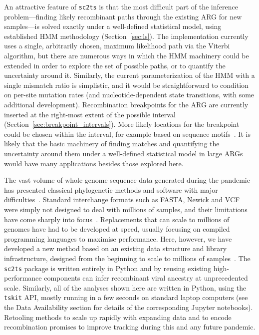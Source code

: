 \documentclass{article}
\begin{document}
An attractive feature of \texttt{sc2ts} is that the most difficult part of
the inference problem---finding likely recombinant paths through the existing ARG
for new samples---is solved exactly under a well-defined statistical model,
using established HMM methodology (Section~\ref{sec:ls}).
The implementation currently uses
a single, arbitrarily chosen, maximum likelihood path via the
Viterbi algorithm, but there are numerous ways in which the HMM machinery
could be extended in order to explore the set of possible paths, or to
quantify the uncertainty around it. Similarly, the current parameterization
of the HMM with a single mismatch ratio is simplistic, and it would
be straightforward to condition on per-site mutation rates (and nucleotide-dependent
state transitions, with some additional development).
Recombination breakpoints for the ARG are currently inserted at the
right-most extent of the possible interval
(Section~\ref{sec:breakpoint_intervals}).
More likely locations for the
breakpoint could be chosen within the interval, for example based
on sequence motifs~\citep{Gallaher2020-mr, Yang2020-ct}.
It is likely that the basic machinery of finding matches and quantifying
the uncertainty around them under a well-defined statistical model
in large ARGs would have many applications besides those explored here.

The vast volume of whole genome sequence data generated during the pandemic
has presented classical phylogenetic methods and software with major
difficulties~\citep{Hodcroft2021-wt}.
Standard interchange formats such as FASTA, Newick and VCF were simply not designed
to deal with millions of samples, and their limitations have come sharply
into focus~\citep{Turakhia2021-ur,de2023maximum}.
Replacements that can scale to millions of genomes have had to be developed
at speed, usually focusing on compiled programming languages to maximise
performance. Here, however, we have developed a new method based on
an existing data structure and library infrastructure, designed
from the beginning to scale to millions of
samples~\citep{Kelleher2016-wk,Kelleher2019-ba}.
The \texttt{sc2ts} package is written entirely in Python
and by reusing existing high-performance components can infer
recombinant viral ancestry at unprecedented scale.
Similarly, all of the analyses shown here are written in Python,
using the \texttt{tskit} API, mostly running in a few seconds
on standard laptop computers (see the Data Availability
section for details of the corresponding Jupyter notebooks).
Retooling methods to scale up rapidly with expanding data and to encode recombination
promises to improve tracking during this and any future pandemic.
\end{document}
